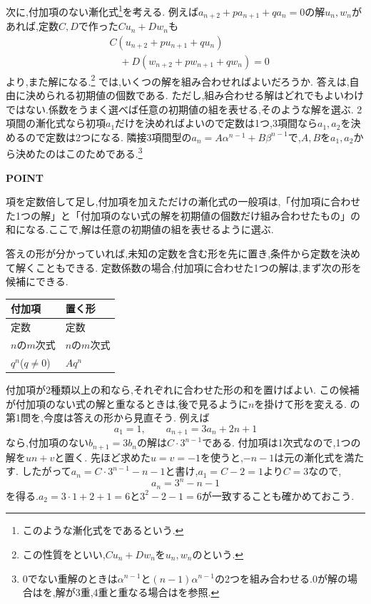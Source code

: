 次に,付加項のない漸化式\footnote{このような漸化式をであるという.}を考える.
例えば$a_{n+2}+pa_{n+1}+qa_n=0$の解$u_n,w_n$があれば,定数$C,D$で作った$Cu_n+Dw_n$も
\begin{align*}
  &C(u_{n+2}+pu_{n+1}+qu_n)\\
  &\quad+D(w_{n+2}+pw_{n+1}+qw_n)=0
\end{align*}
より,また解になる.\footnote{この性質をといい,$Cu_n+Dw_n$を$u_n,w_n$のという.}
では,いくつの解を組み合わせればよいだろうか.
答えは,自由に決められる初期値の個数である.
ただし,組み合わせる解はどれでもよいわけではない.係数をうまく選べば任意の初期値の組を表せる,そのような解を選ぶ.
2項間の漸化式なら初項$a_1$だけを決めればよいので定数は1つ,3項間なら$a_1,a_2$を決めるので定数は2つになる.
隣接3項間型の$a_n=A\alpha^{n-1}+B\beta^{n-1}$で,$A,B$を$a_1,a_2$から決めたのはこのためである.\footnote{0でない重解のときは$\alpha^{n-1}$と$(n-1)\alpha^{n-1}$の2つを組み合わせる.0が解の場合はを,解が3重,4重と重なる場合はを参照.}

\begin{bookpoint}
  \textbf{POINT}\par
  項を定数倍して足し,付加項を加えただけの漸化式の一般項は,「付加項に合わせた1つの解」と「付加項のない式の解を初期値の個数だけ組み合わせたもの」の和になる.ここで,解は任意の初期値の組を表せるように選ぶ.
\end{bookpoint}

答えの形が分かっていれば,未知の定数を含む形を先に置き,条件から定数を決めて解くこともできる.
定数係数の場合,付加項に合わせた1つの解は,まず次の形を候補にできる.
\begin{center}
  \renewcommand{\arraystretch}{1.4}
  \begin{tabular}{l|l}
    付加項&置く形\\ \hline
    定数&定数\\
    $n$の$m$次式&$n$の$m$次式\\
    $q^n$\quad($q\ne0$)&$Aq^n$
  \end{tabular}
\end{center}
付加項が2種類以上の和なら,それぞれに合わせた形の和を置けばよい.
この候補が付加項のない式の解と重なるときは,後で見るように$n$を掛けて形を変える.
の第1問を,今度は答えの形から見直そう.
例えば
\[
  a_1=1,\qquad a_{n+1}=3a_n+2n+1
\]
なら,付加項のない$b_{n+1}=3b_n$の解は$C\cdot3^{n-1}$である.
付加項は1次式なので,1つの解を$un+v$と置く.
先ほど求めた$u=v=-1$を使うと,$-n-1$は元の漸化式を満たす.
したがって$a_n=C\cdot3^{n-1}-n-1$と書け,$a_1=C-2=1$より$C=3$なので,
\[
  a_n=3^n-n-1
\]
を得る.$a_2=3\cdot1+2+1=6$と$3^2-2-1=6$が一致することも確かめておこう.

